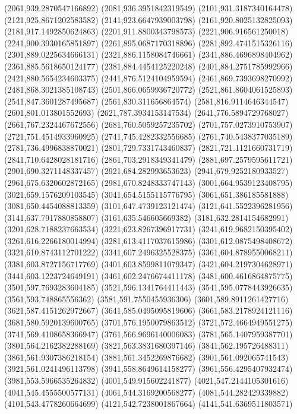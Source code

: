 {(2061,939.2870547166892)
(2081,936.3951842319549)
(2101,931.3187340164478)
(2121,925.8671202583582)
(2141,923.6647939003798)
(2161,920.8025132825093)
(2181,917.1492850624863)
(2201,911.8800343798573)
(2221,906.916561250018)
(2241,900.3930165851897)
(2261,895.0687170318896)
(2281,892.4741515326116)
(2301,889.0225634666131)
(2321,886.1158084746661)
(2341,886.4696898404962)
(2361,885.5618650124177)
(2381,884.4454125220248)
(2401,884.2751785992966)
(2421,880.5654234603375)
(2441,876.5124104959594)
(2461,869.7393698270992)
(2481,868.3021385108743)
(2501,866.0659936720772)
(2521,861.8604061525893)
(2541,847.3601287495687)
(2561,830.311656864574)
(2581,816.9114646344547)
(2601,801.013801552693)
(2621,787.3934153147534)
(2641,776.5894729768027)
(2661,767.2324467672556)
(2681,760.5059257235702)
(2701,757.0273910753907)
(2721,751.4514933960925)
(2741,745.4282332556685)
(2761,740.5438377035189)
(2781,736.4996838870021)
(2801,729.7331743460837)
(2821,721.1121660731719)
(2841,710.6428028181716)
(2861,703.2918349341479)
(2881,697.2579595611721)
(2901,690.3271148337457)
(2921,684.282993653623)
(2941,679.9252180933527)
(2961,675.6320602872165)
(2981,670.8248333747143)
(3001,664.9539123408795)
(3021,659.1576209103545)
(3041,654.5155115776795)
(3061,651.386185581888)
(3081,650.4454088813359)
(3101,647.4739123121474)
(3121,641.5522396281956)
(3141,637.7917880858807)
(3161,635.546605669382)
(3181,632.2814154682991)
(3201,628.7188237663534)
(3221,623.8267396917731)
(3241,619.9682150395402)
(3261,616.2266180014994)
(3281,613.4117037615986)
(3301,612.0875498408672)
(3321,610.8743112701222)
(3341,607.2496325528375)
(3361,604.8789550068211)
(3381,603.8727156717769)
(3401,603.8599811079347)
(3421,604.2197304628971)
(3441,603.1223724649191)
(3461,602.2476674411178)
(3481,600.4616864875775)
(3501,597.7693283604185)
(3521,596.1341764411443)
(3541,595.0778443926635)
(3561,593.748865556362)
(3581,591.7550455936306)
(3601,589.8911261427716)
(3621,587.4151262972667)
(3641,585.0495095819606)
(3661,583.2178924121116)
(3681,580.5920139600765)
(3701,576.1950079863512)
(3721,572.4664949551275)
(3741,569.4108658366947)
(3761,566.9696140006083)
(3781,565.1407959387701)
(3801,564.2162382288169)
(3821,563.3831680397146)
(3841,562.195726488311)
(3861,561.9307386218154)
(3881,561.3452269876682)
(3901,561.092065741543)
(3921,561.0241496113798)
(3941,558.8649614158277)
(3961,556.4295407932474)
(3981,553.5966535264832)
(4001,549.915602241877)
(4021,547.2144105301616)
(4041,545.4555500577131)
(4061,544.3169200568277)
(4081,544.282429339882)
(4101,543.4778260664699)
(4121,542.7238001867664)
(4141,541.6369511803571)
}
